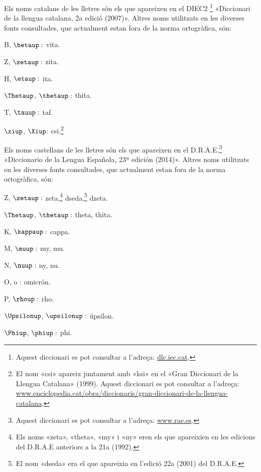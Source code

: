 Els noms catalans de les lletres són els que apareixen en el DIEC2 \footnote{Aquest diccionari es pot consultar a l'adreça: \href{http://dlc.iec.cat/}{dlc.iec.cat}.} «Diccionari de la llengua catalana, 2a edició (2007)». Altres noms utilitzats en
les diverses fonts consultades, que actualment estan fora de la norma ortogràfica, són:
\begin{multicols}{3}
\begin{list}{}
   {\setlength{\labelwidth}{16mm} \setlength{\leftmargin}{16mm} \setlength{\labelsep}{2mm}}
   \item[B, $\betaup :$] vita.
   \item[Z, $\zetaup :$] zita.
   \item[H, $\etaup :$] ita.
   \item[$\Thetaup$, $\thetaup :$] thita.
   \item[T, $\tauup :$] taf.
   \item[$\xiup$, $\Xiup$:] csi.\footnote{El nom «csi» apareix juntament amb «ksi» en el «Gran Diccionari de la Llengua Catalana» (1999). Aquest diccionari es pot consultar a l'adreça:  \href{http://www.enciclopedia.cat/obra/diccionaris/gran-diccionari-de-la-llengua-catalana}{www.enciclopedia.cat/obra/diccionaris/gran-diccionari-de-la-llengua-catalana}.}
\end{list}
\end{multicols}

Els noms castellans de les lletres són els que apareixen en el D.R.A.E.\footnote{Aquest diccionari es pot consultar a l'adreça:  \href{http://www.rae.es/}{www.rae.es}.}
«Diccionario de la Lengua Española, 23ª
edición (2014)». Altres noms utilitzats en les diverses fonts
consultades, que actualment estan fora de la norma ortogràfica, són:
\begin{multicols}{3}
\begin{list}{}
   {\setlength{\labelwidth}{16mm} \setlength{\leftmargin}{16mm} \setlength{\labelsep}{2mm}}
   \item[Z, $\zetaup :$] zeta,\footnote{\label{fn:zeta}Els noms «zeta», «theta», «my» i «ny» eren els que apareixien en les edicions
   del D.R.A.E anteriors a la 21a (1992).} dseda,\footnote{El nom «dseda» era el que apareixia en l'edició 22a (2001) del D.R.A.E.} dzeta.
   \item[$\Thetaup$, $\thetaup :$] theta, thita.
   \item[K, $\kappaup :$] cappa.
   \item[M, $\muup :$] my, mu.
   \item[N, $\nuup :$] ny, nu.
   \item[O, o :] omicrón.
   \item[P, $\rhoup :$] rho.
   \item[$\Upsilonup$, $\upsilonup :$] úpsilon.
   \item[$\Phiup$, $\phiup :$] phi.
\end{list}
\end{multicols}

